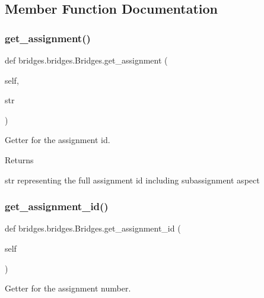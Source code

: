 \subsection{Member Function Documentation}
\mbox{\label{classbridges_1_1bridges_1_1_bridges_a1e7bd56f6a3beb03c91fc989cf3f7eb8}} 
\subsubsection{\texorpdfstring{get\+\_\+assignment()}{get\_assignment()}}
{\footnotesize\ttfamily def bridges.\+bridges.\+Bridges.\+get\+\_\+assignment (\begin{DoxyParamCaption}\item[{}]{self,  }\item[{}]{str }\end{DoxyParamCaption})}



Getter for the assignment id. 

\begin{DoxyReturn}{Returns}


str representing the full assignment id including subassignment aspect 
\end{DoxyReturn}
\mbox{\label{classbridges_1_1bridges_1_1_bridges_a94f39f11368031ad33800aac0bac2f7d}} 
\subsubsection{\texorpdfstring{get\+\_\+assignment\+\_\+id()}{get\_assignment\_id()}}
{\footnotesize\ttfamily def bridges.\+bridges.\+Bridges.\+get\+\_\+assignment\+\_\+id (\begin{DoxyParamCaption}\item[{}]{self }\end{DoxyParamCaption})}



Getter for the assignment number. 


